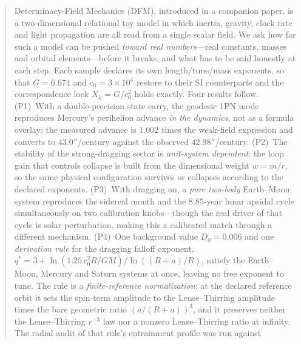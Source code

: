 \documentclass[aps,reprint,amsmath,amssymb,nofootinbib,superscriptaddress,floatfix]{revtex4-2}
\begin{document}
\begin{abstract}
Determinacy-Field Mechanics (DFM), introduced in a companion paper, is
a two-dimensional relational toy model in which inertia, gravity, clock
rate and light propagation are all read from a single scalar field.
We ask how far such a model can be pushed \emph{toward real
numbers}---real constants, masses and orbital elements---before it
breaks, and what has to be said honestly at each step.
Each sample declares its own length/time/mass exponents, so that
$G=6.674$ and $c_0=3\times10^{4}$ restore to their SI counterparts and
the correspondence lock $X_k=G/c_0^{2}$ holds exactly.
Four results follow.
(P1)~With a double-precision state carry, the geodesic 1PN mode
reproduces Mercury's perihelion advance \emph{in the dynamics}, not as
a formula overlay: the measured advance is $1.002$ times the weak-field
expression and converts to $43.0''$/century against the observed
$42.98''$/century.
(P2)~The stability of the strong-dragging sector is \emph{unit-system
dependent}: the loop gain that controls collapse is built from the
dimensional weight $w=m/r$, so the same physical configuration
survives or collapses according to the declared exponents.
(P3)~With dragging on, a \emph{pure two-body} Earth--Moon system
reproduces the sidereal month and the $8.85$-year lunar apsidal cycle
simultaneously on two calibration knobs---though the real driver of
that cycle is solar perturbation, making this a calibrated match
through a different mechanism.
(P4)~One background value $D_0=0.006$ and one \emph{derivation rule}
for the dragging falloff exponent,
$q^{*}=3+\ln(1.25\,c_0^{2}R/GM)/\ln((R+a)/R)$, satisfy the Earth--Moon,
Mercury and Saturn systems at once, leaving no free exponent to tune.
The rule is a \emph{finite-reference normalization}: at the declared
reference orbit it sets the spin-term amplitude to the Lense--Thirring
amplitude times the bare geometric ratio $(a/(R+a))^{3}$, and it
preserves neither the Lense--Thirring $r^{-3}$ law nor a nonzero
Lense--Thirring ratio at infinity.
The radial audit of that rule's entrainment profile was run against

\end{abstract}
\end{document}
